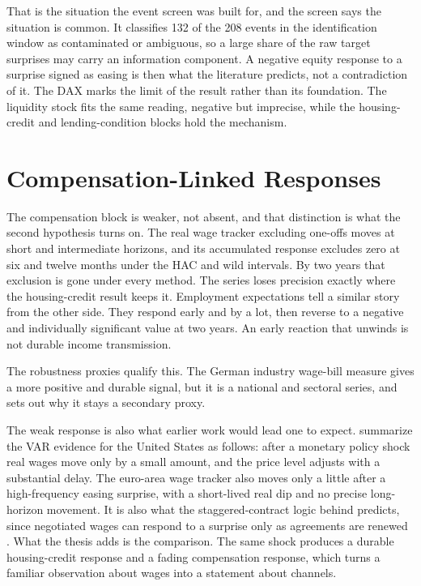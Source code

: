 That is the situation the event screen was built for, and the screen says the situation is common. It classifies 132 of the 208 events in the identification window as contaminated or ambiguous, so a large share of the raw target surprises may carry an information component. A negative equity response to a surprise signed as easing is then what the literature predicts, not a contradiction of it. The DAX marks the limit of the result rather than its foundation. The liquidity stock fits the same reading, negative but imprecise, while the housing-credit and lending-condition blocks hold the mechanism.

\section{Compensation-Linked Responses}

The compensation block is weaker, not absent, and that distinction is what the second hypothesis turns on. The real wage tracker excluding one-offs moves at short and intermediate horizons, and its accumulated response excludes zero at six and twelve months under the HAC and wild intervals. By two years that exclusion is gone under every method. The series loses precision exactly where the housing-credit result keeps it. Employment expectations tell a similar story from the other side. They respond early and by a lot, then reverse to a negative and individually significant value at two years. An early reaction that unwinds is not durable income transmission.

The robustness proxies qualify this. The German industry wage-bill measure gives a more positive and durable signal, but it is a national and sectoral series, and  sets out why it stays a secondary proxy.

The weak response is also what earlier work would lead one to expect. \textcite{ChristianoEichenbaumEvans1999} summarize the VAR evidence for the United States as follows: after a monetary policy shock real wages move only by a small amount, and the price level adjusts with a substantial delay. The euro-area wage tracker also moves only a little after a high-frequency easing surprise, with a short-lived real dip and no precise long-horizon movement. It is also what the staggered-contract logic behind  predicts, since negotiated wages can respond to a surprise only as agreements are renewed \parencite{Taylor1980}. What the thesis adds is the comparison. The same shock produces a durable housing-credit response and a fading compensation response, which turns a familiar observation about wages into a statement about channels.

